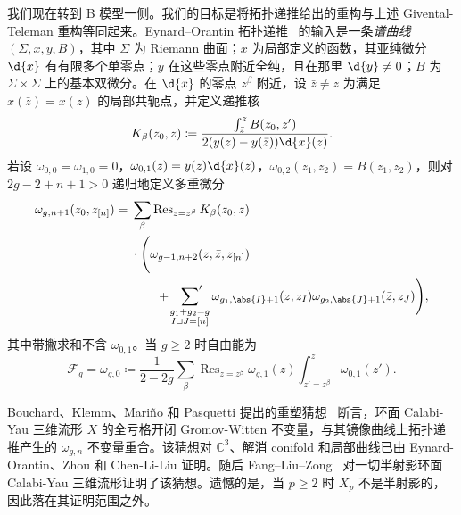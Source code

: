 \documentclass{amsart}
\theoremstyle{definition}
\theoremstyle{remark}
\theoremstyle{plain}
\theoremstyle{definition}
\theoremstyle{remark}
\newcommand{\C}{\mathbb{C}}
\newcommand{\mc}[1]{\mathcal{#1}}
\newcommand{\on}[1]{\operatorname{#1}}
\newcommand{\1}{\mathbf{1}}
\newcommand{\2}{\mathbf{2}}
\newcommand{\3}{\mathbf{3}}
\begin{document}
我们现在转到 B 模型一侧。我们的目标是将拓扑递推给出的重构与上述 Givental-Teleman 重构等同起来。Eynard--Orantin 拓扑递推~\cite{EO2007} 的输入是一条\textit{谱曲线} \((\Sigma,x,y,B)\)，其中 \(\Sigma\) 为 Riemann 曲面；\(x\) 为局部定义的函数，其亚纯微分 \(\d{x}\) 有有限多个单零点；\(y\) 在这些零点附近全纯，且在那里 \(\d{y} \neq 0\)；\(B\) 为 \(\Sigma \times \Sigma\) 上的基本双微分。在 \(\d{x}\) 的零点 \(z^{\beta}\) 附近，设 \(\bar{z} \neq z\) 为满足 \(x(\bar{z}) = x(z)\) 的局部共轭点，并定义递推核
\[ K_{\beta}(z_0,z) \coloneqq \frac{\int_{\bar{z}}^z B(z_0,z')}{2(y(z)-y(\bar{z}))\d{x}(z)}. \]
若设 \(\omega_{0,0} = \omega_{1,0} = 0\)，\(\omega_{0,1}(z) = y(z)\d{x}(z)\)，\(\omega_{0,2}(z_1,z_2) = B(z_1,z_2)\)，则对 \(2g-2+n+1 > 0\) 递归地定义多重微分
\begin{align*}
    \omega_{g,n+1}(z_0,z_{[n]}) ={}& \sum_{\beta}\on{Res}_{z = z^{\beta}} K_{\beta}(z_0,z) \\
    &\cdot \Bigg( \omega_{g-1,n+2}(z,\bar{z},z_{[n]}) \\
    &\qquad + \sideset{}{'}\sum_{\substack{g_1+g_2 = g \\ I \sqcup J = [n]}}\omega_{g_1,\abs{I}+1}(z,z_I)\omega_{g_2,\abs{J}+1}(\bar{z},z_J)\Bigg),
\end{align*}
其中带撇求和不含 \(\omega_{0,1}\)。当 \(g \geq 2\) 时自由能为
\[ \mc{F}_g = \omega_{g,0} \coloneqq \frac{1}{2-2g}\sum_{\beta}\on{Res}_{z=z^{\beta}}\omega_{g,1}(z)\int_{z'=z^{\beta}}^z \omega_{0,1}(z'). \]

Bouchard、Klemm、Mari\~{n}o 和 Pasquetti 提出的重塑猜想~\cite{BKMP2009} 断言，环面 Calabi-Yau 三维流形 \(X\) 的全亏格开闭 Gromov-Witten 不变量，与其镜像曲线上拓扑递推产生的 \(\omega_{g,n}\) 不变量重合。该猜想对 \(\C^3\)、解消 conifold 和局部曲线已由 Eynard-Orantin、Zhou 和 Chen-Li-Liu 证明。随后 Fang--Liu--Zong~\cite{FLZ2020} 对一切半射影环面 Calabi-Yau 三维流形证明了该猜想。遗憾的是，当 \(p \geq 2\) 时 \(X_p\) 不是半射影的，因此落在其证明范围之外。
\end{document}
